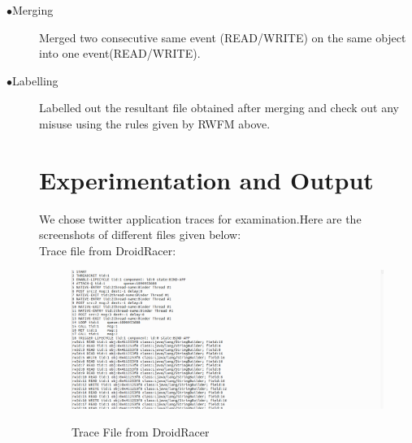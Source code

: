\documentclass[11pt]{report}
\begin{document}
\begin{description}
\item[$\bullet$Merging] Merged two consecutive same event (READ/WRITE) on the same object into one event(READ/WRITE).\\
\item[$\bullet$Labelling]  Labelled out the resultant file obtained after merging and check out any misuse using the rules given by RWFM above.\\

\chapter{Experimentation and Output}
\par We chose twitter application traces for examination.Here are the screenshots of different files given below:\\
Trace file from DroidRacer:\\
\begin{figure}
\centering
\includegraphics[width=150mm]{./images/traces.png}\\
\caption{Trace File from DroidRacer}
\end{figure}


\end{description}
\end{document}
